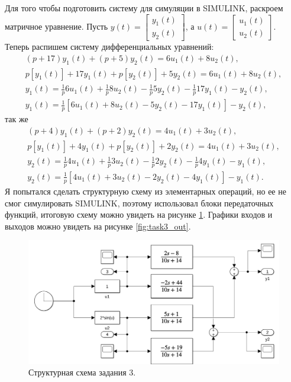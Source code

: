 Для того чтобы подготовить систему для симуляции в SIMULINK, раскроем матричное уравнение.
Пусть $y(t)=\begin{bmatrix}y_1(t)\\y_2(t)\end{bmatrix}$, 
а $u(t)=\begin{bmatrix}u_1(t)\\u_2(t)\end{bmatrix}$.
Теперь распишем систему дифференциальных уравнений:
\begin{equation*}
    \begin{array}{c}
        (p+17)y_1(t)+(p+5)y_2(t)=6u_1(t)+8u_2(t),\\[2mm]
        p[y_1(t)]+17y_1(t)+p[y_2(t)]+5y_2(t)=6u_1(t)+8u_2(t),\\[2mm]
        y_1(t)=\frac{1}{p}6u_1(t)+\frac{1}{p}8u_2(t)-\frac{1}{p}5y_2(t)-\frac{1}{p}17y_1(t)-y_2(t),\\[2mm]
        y_1(t)=\frac{1}{p}\left[6u_1(t)+8u_2(t)-5y_2(t)-17y_1(t)\right]-y_2(t),
    \end{array}
\end{equation*}
так же
\begin{equation*}
    \begin{array}{c}
        (p+4)y_1(t)+(p+2)y_2(t)=4u_1(t)+3u_2(t),\\[2mm]
        p[y_1(t)]+4y_1(t)+p[y_2(t)]+2y_2(t)=4u_1(t)+3u_2(t),\\[2mm]
        y_2(t)=\frac{1}{p}4u_1(t)+\frac{1}{p}3u_2(t)-\frac{1}{p}2y_2(t)-\frac{1}{p}4y_1(t)-y_1(t),\\[2mm]
        y_2(t)=\frac{1}{p}\left[4u_1(t)+3u_2(t)-2y_2(t)-4y_1(t)\right]-y_1(t).
    \end{array}
\end{equation*}
Я попытался сделать структурную схему из элементарных операций, но ее не смог 
симулировать SIMULINK, поэтому использовал блоки передаточных функций, итоговую
схему можно увидеть на рисунке \ref{fig:task3_slx}. Графики входов и выходов
можно увидеть на рисунке \ref{fig:task3_out}.
\begin{figure}[htbp]
    \centering
    \includegraphics[width=1\linewidth]{figs/task_3_slx.png}
    \caption{Структурная схема задания 3.}
    \label{fig:task3_slx}
\end{figure}
